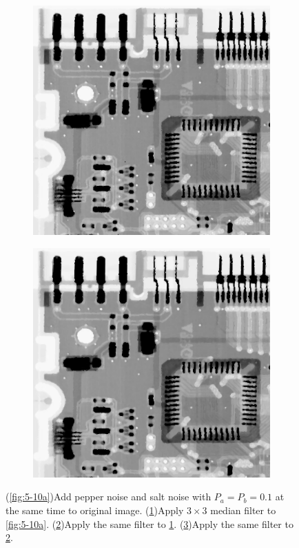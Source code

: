 \begin{figure}[h]
\begin{subfigure}[b]{0.4\linewidth}
		\caption{}
		\label{fig:5-10b}
	\end{subfigure}
  	\begin{subfigure}[b]{0.4\linewidth}
		\includegraphics[width=\linewidth]{myfigure/p4/42-pepsalt-median-2.png}
		\caption{}
		\label{fig:5-10c}
	\end{subfigure}
  	\begin{subfigure}[b]{0.4\linewidth}
		\includegraphics[width=\linewidth]{myfigure/p4/42-pepsalt-median-3.png}
		\caption{}
		\label{fig:5-10d}
	\end{subfigure}
  	\caption{(\ref{fig:5-10a})Add pepper noise and salt noise with $P_a=P_b=0.1$ at the same time to original image. (\ref{fig:5-10b})Apply $3\times 3$ median filter to \ref{fig:5-10a}.  (\ref{fig:5-10c})Apply the same filter to \ref{fig:5-10b}.  (\ref{fig:5-10d})Apply the same filter to \ref{fig:5-10c}. }
  	\label{fig:5-10}
\end{figure}
